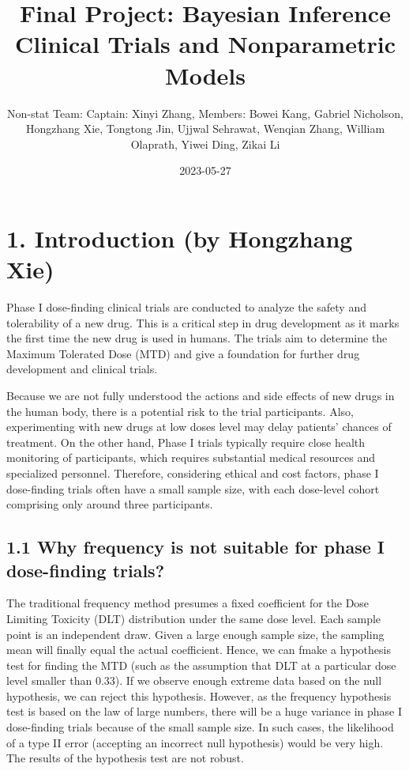\documentclass[
]{article}
\title{Final Project: Bayesian Inference Clinical Trials and
Nonparametric Models}
\author{Non-stat Team: Captain: Xinyi Zhang, Members: Bowei Kang,
Gabriel Nicholson, Hongzhang Xie, Tongtong Jin, Ujjwal Sehrawat, Wenqian
Zhang, William Olaprath, Yiwei Ding, Zikai Li}
\date{2023-05-27}
\begin{document}
\maketitle

\hypertarget{introduction-by-hongzhang-xie}{%
\section{1. Introduction (by Hongzhang
Xie)}\label{introduction-by-hongzhang-xie}}

Phase I dose-finding clinical trials are conducted to analyze the safety
and tolerability of a new drug. This is a critical step in drug
development as it marks the first time the new drug is used in humans.
The trials aim to determine the Maximum Tolerated Dose (MTD) and give a
foundation for further drug development and clinical trials.

Because we are not fully understood the actions and side effects of new
drugs in the human body, there is a potential risk to the trial
participants. Also, experimenting with new drugs at low doses level may
delay patients' chances of treatment. On the other hand, Phase I trials
typically require close health monitoring of participants, which
requires substantial medical resources and specialized personnel.
Therefore, considering ethical and cost factors, phase I dose-finding
trials often have a small sample size, with each dose-level cohort
comprising only around three participants.

\hypertarget{why-frequency-is-not-suitable-for-phase-i-dose-finding-trials}{%
\subsection{1.1 Why frequency is not suitable for phase I dose-finding
trials?}\label{why-frequency-is-not-suitable-for-phase-i-dose-finding-trials}}

The traditional frequency method presumes a fixed coefficient for the
Dose Limiting Toxicity (DLT) distribution under the same dose level.
Each sample point is an independent draw. Given a large enough sample
size, the sampling mean will finally equal the actual coefficient.
Hence, we can fmake a hypothesis test for finding the MTD (such as the
assumption that DLT at a particular dose level smaller than 0.33). If we
observe enough extreme data based on the null hypothesis, we can reject
this hypothesis. However, as the frequency hypothesis test is based on
the law of large numbers, there will be a huge variance in phase I
dose-finding trials because of the small sample size. In such cases, the
likelihood of a type II error (accepting an incorrect null hypothesis)
would be very high. The results of the hypothesis test are not robust.
\end{document}
